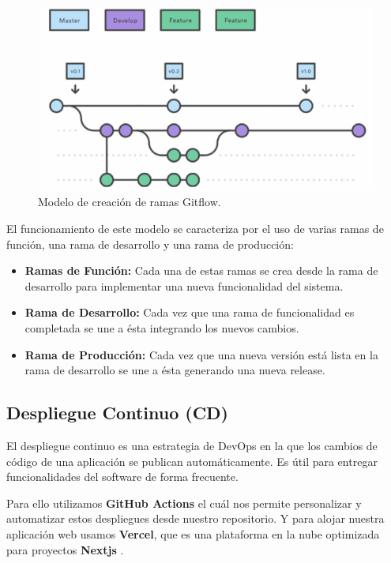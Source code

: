 \documentclass[12pt,twoside,titlepage]{report}
\begin{document}
\begin{figure}[H]
    \centering
    \includegraphics[scale=0.58]{DevOps/Gitflow}
    \caption{Modelo de creación de ramas Gitflow.}
    \label{fig:Gitflow}
\end{figure}

El funcionamiento de este modelo se caracteriza por el uso de varias ramas de función, una rama de desarrollo y una rama de producción:

\begin{itemize}
    \item \textbf{Ramas de Función:} Cada una de estas ramas se crea desde la rama de desarrollo para implementar una nueva funcionalidad del sistema.
    \item \textbf{Rama de Desarrollo:} Cada vez que una rama de funcionalidad es completada se une a ésta integrando los nuevos cambios.
    \item \textbf{Rama de Producción:} Cada vez que una nueva versión está lista en la rama de desarrollo se une a ésta generando una nueva release.
\end{itemize}

\subsection{Despliegue Continuo (CD)}
\label{sec:dc}

El despliegue continuo es una estrategia de DevOps en la que los cambios de código de una aplicación se publican automáticamente. Es útil para entregar funcionalidades del software de forma frecuente.
\cite{dc}

Para ello utilizamos \textbf{GitHub Actions} \cite{githubActions} el cuál nos permite personalizar y automatizar estos despliegues desde nuestro repositorio. Y para alojar nuestra aplicación web usamos \textbf{Vercel}, que es una plataforma en la nube optimizada para proyectos \textbf{Nextjs} \cite{vercelNext}.
\end{document}
